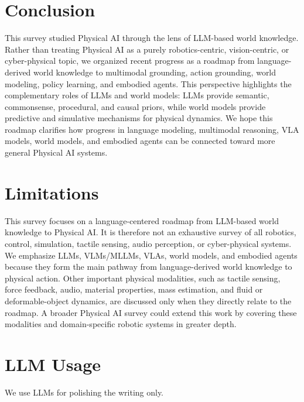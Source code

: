 \section{Conclusion}
\label{sec:conclusion}

This survey studied Physical AI through the lens of LLM-based world knowledge. 
Rather than treating Physical AI as a purely robotics-centric, vision-centric, or cyber-physical topic, we organized recent progress as a roadmap from language-derived world knowledge to multimodal grounding, action grounding, world modeling, policy learning, and embodied agents. 
This perspective highlights the complementary roles of LLMs and world models: LLMs provide semantic, commonsense, procedural, and causal priors, while world models provide predictive and simulative mechanisms for physical dynamics. 
We hope this roadmap clarifies how progress in language modeling, multimodal reasoning, VLA models, world models, and embodied agents can be connected toward more general Physical AI systems.


\newpage

\section{Limitations}

This survey focuses on a language-centered roadmap from LLM-based world knowledge to Physical AI. 
It is therefore not an exhaustive survey of all robotics, control, simulation, tactile sensing, audio perception, or cyber-physical systems. 
We emphasize LLMs, VLMs/MLLMs, VLAs, world models, and embodied agents because they form the main pathway from language-derived world knowledge to physical action. 
Other important physical modalities, such as tactile sensing, force feedback, audio, material properties, mass estimation, and fluid or deformable-object dynamics, are discussed only when they directly relate to the roadmap. 
A broader Physical AI survey could extend this work by covering these modalities and domain-specific robotic systems in greater depth.

\section{LLM Usage}
We use LLMs for polishing the writing only.